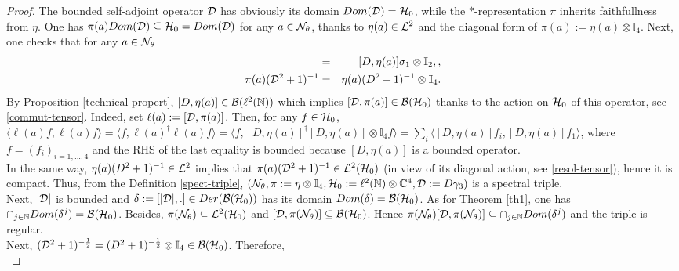 \documentclass[a4paper]{jpconf}
\numberwithin{equation}{section}
\newcommand\bbone{{ \mathbb{I}}}
\theoremstyle{nonumberplain}
\newtheorem{proof}{Proof}
\begin{document}
\begin{proof}
The bounded self-adjoint operator ${\cal{D}}$ has obviously its domain $Dom({\cal{D}})={\cal{H}}_0$, while the $*$-representation $\pi$ inherits faithfullness from $\eta$. One has $\pi(a)Dom({\cal{D}})\subseteq {\cal{H}}_0=Dom({\cal{D}})$ for any $a\in{\cal{N}}_\theta$, thanks to $\eta(a)\in{\cal{L}}^2$ and the diagonal form of $\pi(a):=\eta(a)\otimes\bbone_4$. Next, one checks that for any $a\in{\cal{N}}_\theta$
\begin{eqnarray}
[{\cal{D}},\pi(a)]&=&[D,\eta(a)]\sigma_1\otimes\bbone_2,\label{commut-tensor},\\
\pi(a)({\cal{D}}^2+1)^{-1}&=&\eta(a)(D^2+1)^{-1}\otimes\bbone_4\label{resol-tensor}.
\end{eqnarray}
By Proposition \ref{technical-propert}, $[D,\eta(a)]\in{\cal{B}}(\ell^2(\mathbb{N}))$ which implies $[{\cal{D}},\pi(a)]\in{\cal{B}}({\cal{H}}_0)$ thanks to the action on ${\cal{H}}_0$ of this operator, see \eqref{commut-tensor}. Indeed, set $\ell(a):=[{\cal{D}},\pi(a)]$. Then, for any $f\in{\cal{H}}_0$, $\langle \ell(a)f ,\ell(a)f \rangle=\langle f ,\ell(a)^\dag\ell(a)f \rangle=\langle f ,[D,\eta(a)]^\dag[D,\eta(a)]\otimes\bbone_4f \rangle=\sum_i\langle [D,\eta(a)]f_i , [D,\eta(a)]f_1\rangle$, where $f=(f_i)_{i=1,...,4}$ and the RHS of the last equality is bounded because $[D,\eta(a)]$ is a bounded operator. \\
In the same way, $\eta(a)(D^2+1)^{-1}\in{\cal{L}}^2$ implies that $\pi(a)({\cal{D}}^2+1)^{-1}\in{\cal{L}}^2({\cal{H}}_0)$ (in view of its diagonal action, see \eqref{resol-tensor}), hence it is compact. Thus, from the Definition \ref{spect-triple}, $({\cal{N}}_\theta,\pi:=\eta\otimes\bbone_4,{\cal{H}}_0:=\ell^2(\mathbb{N})\otimes\mathbb{C}^4,{\cal{D}}:=D\gamma_3)$ is a spectral triple.\\
Next, $|{\cal{D}}|$ is bounded and $\delta:=[|{\cal{D}}|,.]\in Der({\cal{B}}({\cal{H}}_0))$ has its domain $Dom(\delta)={\cal{B}}({\cal{H}}_0)$. As for Theorem \ref{th1}, one has $\cap_{j\in\mathbb{N}}Dom(\delta^j) ={\cal{B}}({\cal{H}}_0)$. Besides, $\pi({\cal{N}}_\theta)\subseteq{\cal{L}}^2({\cal{H}}_0)$ and $[{\cal{D}},\pi({\cal{N}}_\theta)]\subseteq{\cal{B}}({\cal{H}}_0)$. Hence $\pi({\cal{N}}_\theta)[{\cal{D}},\pi({\cal{N}}_\theta)]\subseteq\cap_{j\in\mathbb{N}}Dom(\delta^j)$ and the triple is regular.\\
Next, $({\cal{D}}^2+1)^{-\frac{1}{2}}=(D^2+1)^{-\frac{1}{2}}\otimes\bbone_4\in{\cal{B}}({\cal{H}}_0)$. Therefore,
\begin{equation}

\end{equation}
\end{proof}
\end{document}
